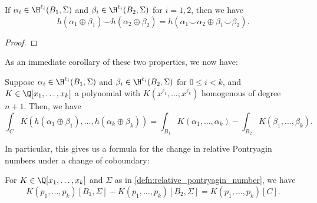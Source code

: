 \begin{proposition}\label{prop:variation_naturality_cup}
	If
	$\alpha_i\in \H^{\ell_i}(B_1,\Sigma)$ and $\beta_i \in \H^{\ell_i}(B_2,\Sigma)$ for $i=1,2$, then we have
	\[
		h(\alpha_1\oplus\beta_1) \smile h(\alpha_2\oplus \beta_2) = h(\alpha_1\smile \alpha_2 \oplus \beta_1\smile \beta_2).
	\]
\end{proposition}
\begin{proof}
\end{proof}

As an immediate corollary of these two properties, we now have:
\begin{corollary}
	Suppose $\alpha_i\in \H^{\ell_i}(B_1, \Sigma)$ and $\beta_i\in \H^{\ell_i}(B_2,\Sigma)$ for $0\leq i < k$, and $K\in \Q[x_1,\ldots,x_k]$ a polynomial with $K(x^{\ell_1}, \ldots, x^{\ell_k})$ homogenous of degree $n+1$. Then, we have
	\[
		\int_C K(h(\alpha_1\oplus \beta_1),\ldots, h(\alpha_k\oplus \beta_k))
		=
		\int_{B_1} K(\alpha_1,\ldots, \alpha_k) - \int_{B_2} K(\beta_1,\ldots, \beta_k).
	\]
\end{corollary}

In particular, this gives us a formula for the change in relative Pontryagin numbers under a change of coboundary:
\begin{proposition}\label{prop:relative_pontryagin_number_variation}
	For $K\in \Q[x_1,\ldots, x_k]$ and $\Sigma$ as in \cref{defn:relative_pontryagin_number}, we have
	\begin{equation}\label{eq:relative_pontryagin_number_variation}
		K(p_1,\ldots,p_k)[B_1,\Sigma] - K(p_1,\ldots, p_k)[B_2,\Sigma] = K(p_1,\ldots,p_k)[C].
	\end{equation}
\end{proposition}


